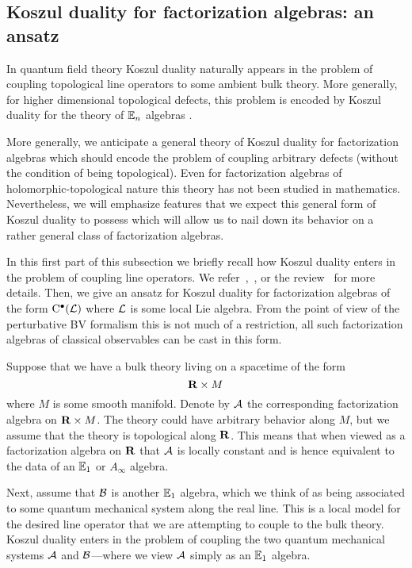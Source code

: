 \subsection{Koszul duality for factorization algebras: an ansatz}
\label{s:noether}

In quantum field theory Koszul duality naturally appears in the problem of coupling topological line operators to some ambient bulk theory. 
More generally, for higher dimensional topological defects, this problem is encoded by Koszul duality for the theory of $\mathbb E_n$ algebras \cite{FrancisGaitsgory} \cite[\S 5.2]{LurieHA}.

More generally, we anticipate a general theory of Koszul duality for factorization algebras which should encode the problem of coupling arbitrary defects (without the condition of being topological).
Even for factorization algebras of holomorphic-topological nature this theory has not been studied in mathematics. 
Nevertheless, we will emphasize features that we expect this general form of Koszul duality to possess which will allow us to nail down its behavior on a rather general class of factorization algebras. 

In this first part of this subsection we briefly recall how Koszul duality enters in the problem of coupling line operators. 
We refer~\cite[\S 6]{CP1},~\cite[\S 8]{CG1}, or the review~\cite{PWkoszul} for more details. 
Then, we give an ansatz for Koszul duality for factorization algebras of the form ${\rm C}^\bullet(\mathcal L)$ where $\mathcal L$ is some local Lie algebra. 
From the point of view of the perturbative BV formalism this is not much of a restriction, all such factorization algebras of classical observables can be cast in this form. 

\parsec[s:lines]
Suppose that we have a bulk theory living on a spacetime of the form 
\[
\mathbf{R} \times M 
\]
where $M$ is some smooth manifold. 
Denote by $\mathcal A$ the corresponding factorization algebra on $\mathbf{R} \times M$. 
The theory could have arbitrary behavior along $M$, but we assume that the theory is topological along $\mathbf{R}$. 
This means that when viewed as a factorization algebra on $\mathbf{R}$ that $\mathcal A$ is locally constant and is hence equivalent to the data of an $\mathbb E_1$ or $A_\infty$ algebra.

Next, assume that $\mathcal B$ is another $\mathbb E_1$ algebra, which we think of as being associated to some quantum mechanical system along the real line.
This is a local model for the desired line operator that we are attempting to couple to the bulk theory.
Koszul duality enters in the problem of coupling the two quantum mechanical systems $\mathcal A$ and $\mathcal B$---where we view $\mathcal A$ simply as an $\mathbb E_1$ algebra. 

